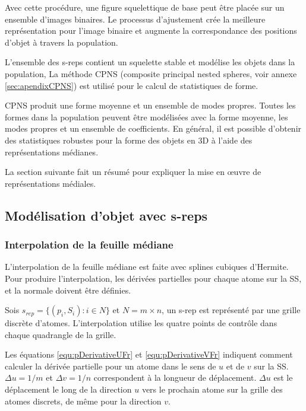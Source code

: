 Avec cette procédure, une figure squelettique de base peut être placée sur un ensemble d'images binaires. 
Le processus d'ajustement crée la meilleure représentation pour 
l'image binaire et augmente la correspondance des positions d'objet à travers la population.

L'ensemble des s-reps contient un squelette stable et modélise les objets dans la population,  
La méthode CPNS (composite principal nested spheres, 
voir annexe \ref{sec:apendixCPNS}) est utilisé pour le calcul de statistiques de forme.

CPNS produit une forme moyenne et un ensemble de modes propres.
Toutes les formes dans la population peuvent être modélisées avec la forme moyenne,  les modes propres et un ensemble de coefficients.
En général, il est possible d'obtenir des statistiques robustes pour la forme des objets 
en 3D à l'aide des représentations médianes.
 
La section suivante fait un résumé pour expliquer la mise en œuvre de représentations médiales.

\subsection{Modélisation d'objet avec s-reps}
\label{sec:s-repImplementationfr}

\subsubsection{Interpolation de la feuille médiane}

L'interpolation de la feuille médiane est faite avec splines cubiques d'Hermite.
Pour produire l'interpolation, les dérivées partielles pour chaque atome sur la SS, et la normale doivent être définies.

Sois $s_{rep} = \{(p_i, S_i) : i \in N\}$ et $N = m \times n$, un s-rep est représenté par une grille discrète d'atomes.
L'interpolation utilise les quatre points de contrôle dans chaque quadrangle de la grille.

Les équations \ref{equ:pDerivativeUFr} et \ref{equ:pDerivativeVFr} indiquent 
comment calculer la dérivée partielle pour un atome dans le sens de $u$ et de $v$ sur la SS. 
$\Delta u = 1/m$ et $\Delta v = 1/n$ correspondent à la longueur de déplacement. 
$\Delta u$ est le déplacement le long de la direction $u$ vers le prochain atome sur 
la grille des atomes discrets, de même pour la direction $v$.

